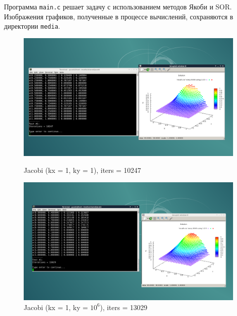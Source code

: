 \documentclass[a4paper, fleqn]{report}
\begin{document}
Программа \texttt{main.c} решает задачу с использованием методов Якоби и SOR. \\
Изображения графиков, полученные в процессе вычислений, сохраняются в директории \texttt{media}. \\

\begin{figure}[h]
    \centering
    \begin{minipage}{0.49\textwidth}
        \centering
        \includegraphics[width=\textwidth]{media/jacobi_1_1.png}
        \caption{Jacobi (kx = 1, ky = 1), iters = 10247}
        \label{fig:jacobi_1_1}
    \end{minipage}%
    \begin{minipage}{0.49\textwidth}
        \centering
        \includegraphics[width=\textwidth]{media/jacobi_1_1000000.png}
        \caption{Jacobi (kx = 1, ky = $10^6$), iters = 13029}
        \label{fig:jacobi_1_1000000}
    \end{minipage}
    \par\bigskip
    \begin{minipage}{0.49\textwidth}
        \centering

\end{minipage}
\end{figure}
\end{document}
